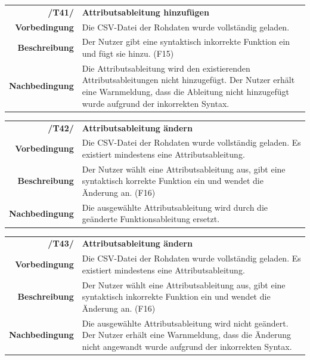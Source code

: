 \documentclass{article}
\begin{document}
\begin{table}[H]
\begin{tabularx}{\textwidth}{rX}
\textbf{/T41/}         & \textbf{Attributsableitung hinzufügen} \\
\textbf{Vorbedingung}  & Die CSV-Datei der Rohdaten wurde vollständig geladen.   \\
\textbf{Beschreibung}  & Der Nutzer gibt eine syntaktisch inkorrekte Funktion ein und fügt sie hinzu. (F15) \\
\textbf{Nachbedingung} & Die Attributsableitung wird den existierenden Attributsableitungen nicht hinzugefügt. Der Nutzer erhält eine Warnmeldung, dass die Ableitung nicht hinzugefügt wurde aufgrund der inkorrekten Syntax.
\end{tabularx}
\end{table}

\begin{table}[H]
\begin{tabularx}{\textwidth}{rX}
\textbf{/T42/}         & \textbf{Attributsableitung ändern} \\
\textbf{Vorbedingung}  & Die CSV-Datei der Rohdaten wurde vollständig geladen. Es existiert mindestens eine Attributsableitung.  \\
\textbf{Beschreibung}  & Der Nutzer wählt eine Attributsableitung aus, gibt eine syntaktisch korrekte Funktion ein und wendet die Änderung an. (F16) \\
\textbf{Nachbedingung} & Die ausgewählte Attributsableitung wird durch die geänderte Funktionsableitung ersetzt.
\end{tabularx}
\end{table}

\begin{table}[H]
\begin{tabularx}{\textwidth}{rX}
\textbf{/T43/}         & \textbf{Attributsableitung ändern} \\
\textbf{Vorbedingung}  & Die CSV-Datei der Rohdaten wurde vollständig geladen. Es existiert mindestens eine Attributsableitung.   \\
\textbf{Beschreibung}  & Der Nutzer wählt eine Attributsableitung aus, gibt eine syntaktisch inkorrekte Funktion ein und wendet die Änderung an. (F16) \\
\textbf{Nachbedingung} & Die ausgewählte Attributsableitung wird nicht geändert. Der Nutzer erhält eine Warnmeldung, dass die Änderung nicht angewandt wurde aufgrund der inkorrekten Syntax.
\end{tabularx}
\end{table}
\end{document}
